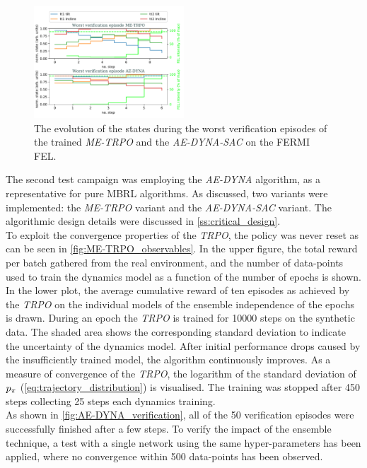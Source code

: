 \documentclass[
reprint,nofootinbib,
amsmath,amssymb,amsfonts,clevref,
aps,
prstab,
]{revtex4-2}
\begin{document}
	\begin{figure}
		\centering
		\includegraphics*[width=0.5\textwidth]{Figures/Worst_episode_MBRL.pdf}
		\caption{The evolution of the states during the worst verification episodes of the trained \emph{ME-TRPO} and the \emph{AE-DYNA-SAC} on the FERMI FEL.}
		\label{fig:Worst_episode_MBRL}
	\end{figure}
	The second test campaign was employing the \emph{AE-DYNA} algorithm, as a representative for pure MBRL algorithms. As discussed, two variants were implemented: the \emph{ME-TRPO} variant and the \emph{AE-DYNA-SAC} variant. The algorithmic design details were discussed in \cref{ss:critical_design}. 
	\\ To exploit the convergence properties of the \emph{TRPO}, the policy was never reset as can be seen in \cref{fig:ME-TRPO_observables}. In the upper figure, the total reward per batch gathered from the real environment, and the number of data-points used to train the dynamics model as a function of the number of epochs is shown. In the lower plot, the average cumulative reward of ten episodes as achieved by the \emph{TRPO} on the individual models of the ensemble independence of the epochs is drawn. During an epoch the \emph{TRPO} is trained for 10000 steps on the synthetic data. The shaded area shows the corresponding standard deviation to indicate the uncertainty of the dynamics model. After initial performance drops caused by the insufficiently trained model, the algorithm continuously improves. As a measure of convergence of the \emph{TRPO}, the logarithm of the standard deviation of $p_\pi$ (\cref{eq:trajectory_distribution}) is visualised. The training was stopped after 450 steps collecting 25 steps each dynamics training.
	\\ As shown in \cref{fig:AE-DYNA_verification}, all of the 50 verification episodes were successfully finished after a few steps. To verify the impact of the ensemble technique, a test with a single network using the same hyper-parameters has been applied, where no convergence within 500 data-points has been observed. \\
\end{document}
